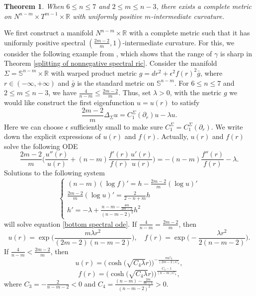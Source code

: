 \documentclass[11pt,letterpaper]{amsart}
\newtheorem{theorem}{Theorem}[section]
\theoremstyle{definition}
\theoremstyle{remark}
\numberwithin{equation}{section}
\begin{document}
\begin{theorem}\label{counterexample of splitting}
    When $6\leq n\leq 7$ and $2\leq m\leq n-3$, there exists a complete metric on $N^{n-m}\times T^{m-1}\times \mathbb{R}$ with uniformly positive $m$-intermediate curvature.
\end{theorem}
We first construct a manifold $N^{n-m}\times \mathbb{R}$ with a complete metric such that it has uniformly positive spectral $(\frac{2m-2}{m},1)$-intermediate curvature. For this, we consider the following example from \cite{XuTrans}, which shows that the range of $\gamma$ is sharp in Theorem \ref{splitting of nonnegative spectral ric}. Consider the manifold $\Sigma=\mathbb{S}^{n-m}\times \mathbb{R}$ with warped product metric $g=dr^2+\epsilon^2f(r)^2\bar{g}$, where $r\in(-\infty,+\infty)$ and $\bar{g}$ is the standard metric on $\mathbb{S}^{n-m}$. For $6\leq n\leq 7$ and $2\leq m\leq n-3$, we have $\frac{4}{n-m}\leq \frac{2m-2}{m}$. Thus, set $\lambda>0$, with the metric $g$ we would like construct the first eigenfunction $u=u(r)$ to satisfy 
\[
\frac{2m-2}{m}\Delta_{\Sigma}u= C_1^\Sigma(\partial_r)u-\lambda u
. 
\]
Here we can choose $\epsilon$ sufficiently small to make sure $C_1^\Sigma=C_1^\Sigma(\partial_r)$. We write down the explicit expressions of $u(r)$ and $f(r)$. Actually, $u(r)$ and $f(r)$ solve the following ODE
\begin{equation}\label{bottom spectral ode}
    \frac{2m-2}{m}\Big(\frac{u''(r)}{u(r)}+(n-m)\frac{f'(r)}{f(r)}\frac{u'(r)}{u(r)}\Big)=-(n-m)\frac{f''(r)}{f(r)}-\lambda.
\end{equation}
Solutions to the following system
\begin{equation}
    \begin{cases}
     (n-m)(\log f)'=h-\frac{2m-2}{m}(\log u)'\\
    \frac{2m-2}{m}(\log u)'=\frac{2}{2-n+m}h\\
    h'=-\lambda+\frac{n-m-\frac{4m}{2m-2}}{(n-m-2)^2}h^2
\end{cases}
\end{equation}
will solve equation \eqref{bottom spectral ode}.
If $\frac{4}{n-m}=\frac{2m-2}{m}$, then
\[
    u(r)=\exp \big(\frac{m\lambda r^2}{(2m-2)(n-m-2)}\big),\quad f(r)=\exp \big(-\frac{\lambda r^2}{2(n-m-2)}\big).
\]
If $\frac{4}{n-m}<\frac{2m-2}{m}$, then
\[
u(r) = \Big(\cosh\Big(\sqrt{C_{4}\lambda}r\Big)\Big)^{-\frac{mC_{3}}{(2m-2)C_{4}}},
\]
\[
f(r)=\Big(\cosh\Big(\sqrt{C_{4}\lambda}r\Big)\Big)^{\frac{C_{3}-1}{(n-m)C_{4}}},
\]
where $C_{3}=-\frac{2}{n-m-2}<0$ and $C_{4}=
\frac{(n-m)-\frac{2m}{m-1}}{(n-m-2)^2}>0$.
\end{document}
